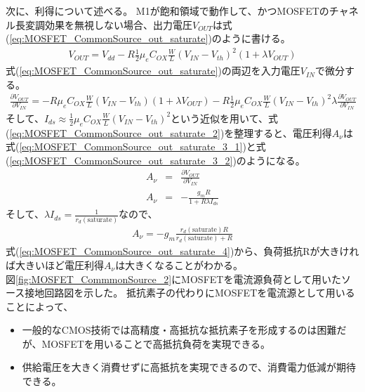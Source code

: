 			次に、利得について述べる。
			M1が飽和領域で動作して、かつMOSFETのチャネル長変調効果を無視しない場合、出力電圧$V_{OUT}$は式(\ref{eq:MOSFET_CommonSource_out_saturate})のように書ける。
			\begin{eqnarray}
				V_{OUT} = V_{dd} - R \frac{1}{2} \mu_e C_{OX} \frac{W}{L} {(V_{IN} - V_{th})}^2 {(1 + \lambda V_{OUT})}
				\label{eq:MOSFET_CommonSource_out_saturate}
			\end{eqnarray}
			式(\ref{eq:MOSFET_CommonSource_out_saturate})の両辺を入力電圧$V_{IN}$で微分する。
			\begin{eqnarray}
				\frac{\partial V_{OUT}}{\partial V_{IN}}
				= -R \mu_e C_{OX} \frac{W}{L} (V_{IN} - V_{th}) (1 + \lambda V_{OUT})
				- R \frac{1}{2} \mu_e C_{OX} \frac{W}{L} {(V_{IN} - V_{th})}^{2} \lambda \frac{\partial V_{OUT}}{\partial V_{IN}}
				\label{eq:MOSFET_CommonSource_out_saturate_2}
			\end{eqnarray}
			そして、$I_{ds} \approx \frac{1}{2} \mu_e C_{OX} \frac{W}{L} {(V_{IN} - V_{th})}^2$という近似を用いて、式(\ref{eq:MOSFET_CommonSource_out_saturate_2})を整理すると、電圧利得$A_{\nu}$は式(\ref{eq:MOSFET_CommonSource_out_saturate_3_1})と式(\ref{eq:MOSFET_CommonSource_out_saturate_3_2})のようになる。
			\begin{eqnarray}
				A_{\nu} & = & \frac{\partial V_{OUT}}{\partial V_{IN}} \\
				\label{eq:MOSFET_CommonSource_out_saturate_3_1}
				A_{\nu} & = & - \frac{g_m R}{1 + R \lambda I_{ds}}
				\label{eq:MOSFET_CommonSource_out_saturate_3_2}
			\end{eqnarray}
			そして、$\lambda I_{ds} = \frac{1}{r_{d} (\mathrm{saturate})}$なので、
			\begin{eqnarray}
				A_{\nu} = - g_{m} \frac{r_{d}(\mathrm{saturate}) R}{r_{d}(\mathrm{saturate}) + R}
				\label{eq:MOSFET_CommonSource_out_saturate_4}
			\end{eqnarray}
			式(\ref{eq:MOSFET_CommonSource_out_saturate_4})から、負荷抵抗Rが大きければ大きいほど電圧利得$A_{\nu}$は大きくなることがわかる。\\
			図\ref{fig:MOSFET_CommmonSource_2}にMOSFETを電流源負荷として用いたソース接地回路図を示した。
			抵抗素子の代わりにMOSFETを電流源として用いることによって、
			\begin{itemize}
				\item 一般的なCMOS技術では高精度・高抵抗な抵抗素子を形成するのは困難だが、MOSFETを用いることで高抵抗負荷を実現できる。
				\item 供給電圧を大きく消費せずに高抵抗を実現できるので、消費電力低減が期待できる。
			\end{itemize}
